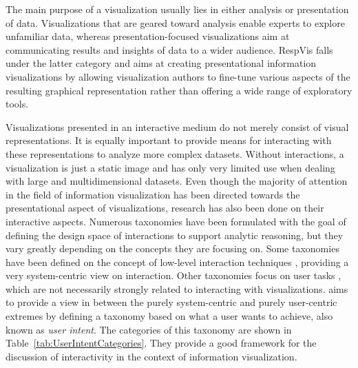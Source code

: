The main purpose of a visualization usually lies in either analysis or
presentation of data. Visualizations that are geared toward analysis
enable experts to explore unfamiliar data, whereas
presentation-focused visualizations aim at communicating results and
insights of data to a wider audience. RespVis falls under the latter
category and aims at creating presentational information
visualizations by allowing visualization authors to fine-tune various
aspects of the resulting graphical representation rather than offering
a wide range of exploratory tools.


Visualizations presented in an interactive medium do not merely
consist of visual representations. It is equally important to provide
means for interacting with these representations to analyze more
complex datasets. Without interactions, a visualization is just a
static image and has only very limited use when dealing with large and
multidimensional datasets. Even though the majority of attention in
the field of information visualization has been directed towards the
presentational aspect of visualizations, research has also been done
on their interactive aspects. Numerous taxonomies have been formulated
with the goal of defining the design space of interactions to support
analytic reasoning, but they vary greatly depending on the concepts
they are focusing on. Some taxonomies have been defined on the concept
of low-level interaction techniques
\parencite{TheEyesHaveIt,GrammarOfGraphics}, providing a very
system-centric view on interaction. Other taxonomies focus on user
tasks \parencite{LowLevelComponentsOfAnalyticActivity}, which are not
necessarily strongly related to interacting with visualizations.
\textcite{RoleOfInteractionInInformationVisualization} aims to provide
a view in between the purely system-centric and purely user-centric
extremes by defining a taxonomy based on what a user wants to achieve,
also known as \emph{user intent}. The categories of this taxonomy are
shown in Table~\ref{tab:UserIntentCategories}. They provide a good
framework for the discussion of interactivity in the context of
information visualization.


